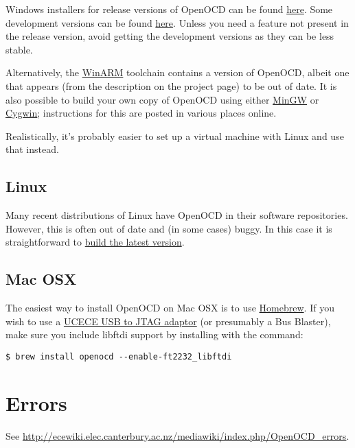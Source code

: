 Windows installers for release versions of OpenOCD can be found
\href{http://www.freddiechopin.info/index.php/en/download/category/4-openocd}{here}.
Some development versions can be found
\href{http://www.freddiechopin.info/index.php/en/download/category/10-openocd-dev}{here}.
Unless you need a feature not present in the release version, avoid
getting the development versions as they can be less stable.

Alternatively, the
\href{http://www.siwawi.arubi.uni-kl.de/avr_projects/arm_projects/}{WinARM}
toolchain contains a version of OpenOCD, albeit one that appears (from
the description on the project page) to be out of date. It is also
possible to build your own copy of OpenOCD using either
\href{http://www.mingw.org/}{MinGW} or
\href{http://www.cygwin.com/}{Cygwin}; instructions for this are posted
in various places online.

Realistically, it's probably easier to set up a virtual machine with
Linux and use that instead.

\subsection{Linux}
\label{linux}

Many recent distributions of Linux have OpenOCD in their software
repositories. However, this is often out of date and (in some cases)
buggy. In this case it is straightforward to
\href{Building_OpenOCD_under_Linux}{build the latest version}.

\subsection{Mac OSX}
\label{mac-osx}

The easiest way to install OpenOCD on Mac OSX is to use
\href{http://brew.sh/}{Homebrew}. If you wish to use a
\href{USB_to_JTAG}{UCECE USB to JTAG adaptor} (or presumably a Bus
Blaster), make sure you include libftdi support by installing with the
command:

\begin{verbatim}
$ brew install openocd --enable-ft2232_libftdi
\end{verbatim}

\section{Errors}
\label{errors}

See \url{http://ecewiki.elec.canterbury.ac.nz/mediawiki/index.php/OpenOCD_errors}.
